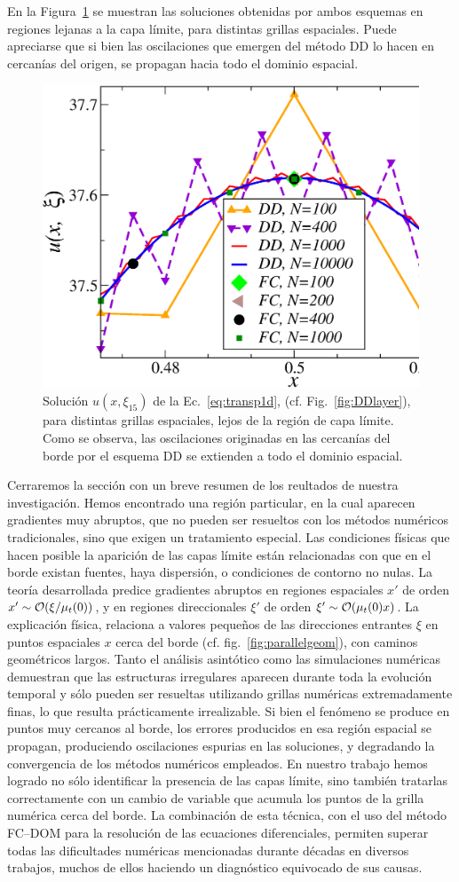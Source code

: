 En la Figura~\ref{fig:DDlayer2} se muestran las soluciones obtenidas por ambos esquemas 
en regiones lejanas a la capa límite, para distintas grillas espaciales. 
Puede apreciarse que si bien las oscilaciones que emergen del método DD lo hacen 
en cercanías del origen, 
se propagan hacia todo el dominio espacial.
\begin{figure}[h!]
\centering
  \includegraphics[width=0.5\linewidth]{figuras/conv_2.eps}
  \caption{Solución $u(x,\xi_{15})$ de la Ec.~\eqref{eq:transp1d}, 
  (cf. Fig.~\ref{fig:DDlayer}), para distintas grillas espaciales, 
  lejos de la región de capa límite. 
  Como se observa, las oscilaciones originadas en 
  las cercanías del borde por el esquema DD se extienden a todo el dominio espacial.}
 \label{fig:DDlayer2}
\end{figure}

Cerraremos la sección con un breve resumen de los reultados de
nuestra investigación.
Hemos encontrado una región particular, en la cual aparecen gradientes
muy abruptos, que no pueden ser resueltos con los métodos numéricos
tradicionales, sino que exigen un tratamiento especial.
Las condiciones físicas que hacen posible la aparición de las capas
límite están relacionadas con que en el borde existan fuentes, haya
dispersión, o condiciones de contorno no nulas.
La teoría desarrollada predice gradientes abruptos en regiones
espaciales $x'$ de orden $x'\sim \mathcal{O}(\xi/\mu_t(0))$, y en regiones
direccionales $\xi'$ de orden $\xi'\sim \mathcal{O}(\mu_t(0) x)$.
La explicación física, relaciona a valores pequeños de las direcciones
entrantes $\xi$ en puntos espaciales $x$ cerca del borde
(cf. fig.~\ref{fig:parallelgeom}), con caminos geométricos largos.
Tanto el análisis asintótico como las simulaciones numéricas demuestran
que las estructuras irregulares aparecen durante toda la evolución temporal
y sólo pueden ser resueltas utilizando grillas numéricas extremadamente
finas, lo que resulta prácticamente irrealizable.
Si bien el fenómeno se produce en puntos muy cercanos al
borde, los errores producidos en esa región espacial se propagan,
produciendo oscilaciones espurias en las soluciones, y degradando la
convergencia de los métodos numéricos empleados.
En nuestro trabajo hemos logrado no sólo identificar la presencia
de las capas límite, sino también tratarlas correctamente con un
cambio de variable que acumula los puntos de la grilla numérica cerca
del borde. La combinación de esta técnica, con el uso del método FC--DOM
para la resolución de las ecuaciones diferenciales, permiten superar
todas las dificultades numéricas mencionadas durante décadas en
diversos trabajos, muchos de ellos haciendo un diagnóstico equivocado
de sus causas.

\pagestyle{empty}


